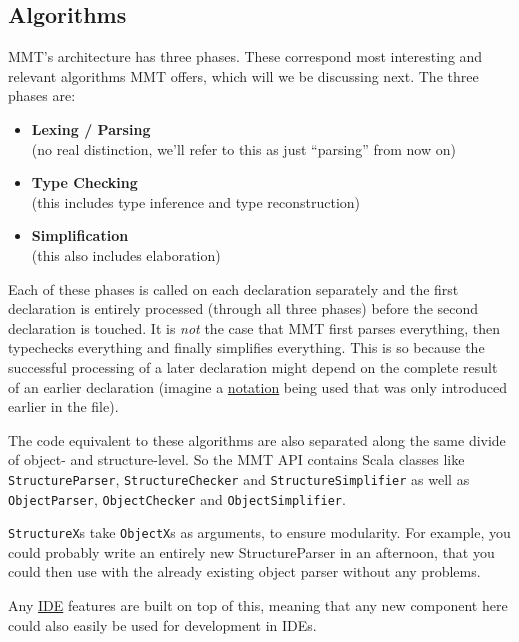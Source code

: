 \documentclass[11pt,a4paper]{article}
\newcommand{\MMT}{\textsf{MMT}\xspace}
\begin{document}
\subsection{Algorithms}

\MMT 's architecture has three phases. These correspond most interesting and relevant algorithms \MMT offers, which will we be discussing next. The three phases are:

\begin{itemize}
\item \textbf{Lexing / Parsing}\\ (no real distinction, we'll refer to this as just ``parsing'' from now on)
\item \textbf{Type Checking}\\ (this includes type inference and type reconstruction)
\item \textbf{Simplification}\\ (this also includes elaboration)
\end{itemize}

Each of these phases is called on each declaration separately and the first declaration is entirely processed (through all three phases) before the second declaration is touched. It is \emph{not} the case that \MMT first parses everything, then typechecks everything and finally simplifies everything. This is so  because the successful processing of a later declaration might depend on the complete result of an earlier declaration (imagine a \href{https://uniformal.github.io/doc/language/declarations.html#notations}{notation} being used that was only introduced earlier in the file).
\bigskip

The code equivalent to these algorithms are also separated along the same divide of object- and structure-level. So the \MMT API contains Scala classes like \texttt{StructureParser}, \texttt{StructureChecker} and \texttt{StructureSimplifier} as well as \texttt{ObjectParser}, \texttt{ObjectChecker} and \texttt{ObjectSimplifier}. 

\texttt{StructureX}s take \texttt{ObjectX}s as arguments, to ensure modularity. For example, you could probably write an entirely new StructureParser in an afternoon, that you could then use with the already existing object parser without any problems. 

Any \href{https://uniformal.github.io/doc/setup/#2-install-an-ide-jedit-or-intellij-idea-if-you-havent-already}{IDE} features are built on top of this, meaning that any new component here could also easily be used for development in IDEs.
\end{document}

